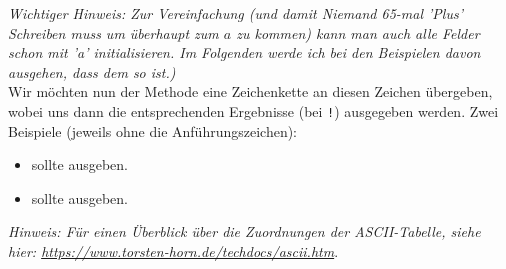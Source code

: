 \documentclass[table]{sopra-base}
\let\T\texttt
\begin{document}
\emph{Wichtiger Hinweis: Zur Vereinfachung (und damit Niemand 65-mal 'Plus' Schreiben muss um überhaupt zum $a$ zu kommen) kann man auch alle Felder schon mit 'a' initialisieren. Im Folgenden werde ich bei den  Beispielen davon ausgehen, dass dem so ist.)}\\

Wir möchten nun der Methode  eine Zeichenkette an diesen Zeichen übergeben, wobei uns dann die entsprechenden Ergebnisse (bei \T{!}) ausgegeben werden. Zwei Beispiele (jeweils ohne die Anführungszeichen):
\begin{itemize}[nolistsep]
    \item \say{\T{!+!+!}} sollte  ausgeben.
    \item \say{\T{-{}-{}-{}-{}-{}-{}-{}-{}-{}-{}-{}-{}-{}-{}-{}-{}-{}-{}-{}-{}-{}-{}-{}-{}-!>!+++++++++++!!+++!}} sollte  ausgeben.
\end{itemize}

\textit{Hinweis: Für einen Überblick über die Zuordnungen der ASCII-Tabelle, siehe hier: \url{https://www.torsten-horn.de/techdocs/ascii.htm}}.
\end{document}
